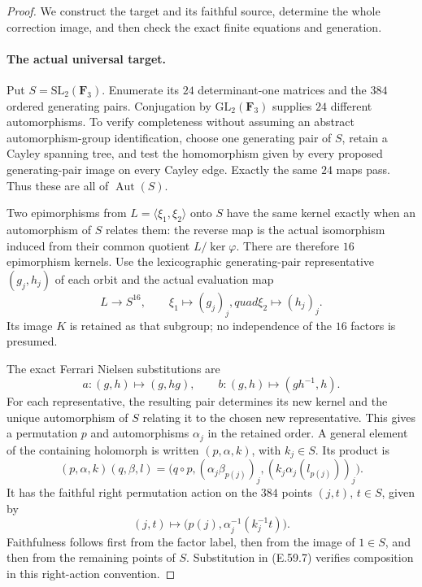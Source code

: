 \begin{proof}
We construct the target and its faithful source, determine the whole
correction image, and then check the exact finite equations and generation.

\paragraph{The actual universal target.}
Put $S=\mathrm{SL}_2(\mathbf F_3)$. Enumerate its $24$ determinant-one
matrices and the $384$ ordered generating pairs. Conjugation by
$\mathrm{GL}_2(\mathbf F_3)$ supplies $24$ different automorphisms.
To verify completeness without assuming an abstract automorphism-group
identification, choose one generating pair of $S$, retain a Cayley
spanning tree, and test the homomorphism given by every proposed
generating-pair image on every Cayley edge. Exactly the same $24$
maps pass. Thus these are all of $\operatorname{Aut}(S)$.

Two epimorphisms from $L=\langle\xi_1,\xi_2\rangle$ onto $S$ have
the same kernel exactly when an automorphism of $S$ relates them:
the reverse map is the actual isomorphism induced from their common
quotient $L/\ker\varphi$. There are therefore $16$ epimorphism kernels.
Use the lexicographic generating-pair representative $(g_j,h_j)$ of
each orbit and the actual evaluation map
\[
 L\longrightarrow S^{16},\qquad
 \xi_1\longmapsto(g_j)_j,quad
 \xi_2\longmapsto(h_j)_j.
 \tag{E.59.5}
\]
Its image $K$ is retained as that subgroup; no independence of the
$16$ factors is presumed.

The exact Ferrari Nielsen substitutions are
\[
 a:(g,h)\longmapsto(g,hg),\qquad
 b:(g,h)\longmapsto(gh^{-1},h).
 \tag{E.59.6}
\]
For each representative, the resulting pair determines its new
kernel and the unique automorphism of $S$ relating it to the chosen
new representative. This gives a permutation $p$ and automorphisms
$\alpha_j$ in the retained order. A general element of the containing
holomorph is written $(p,\alpha,k)$, with $k_j\in S$. Its product is
\[
 (p,\alpha,k)(q,\beta,l)=
 \bigl(q\circ p,(\alpha_j\beta_{p(j)})_j,
                   (k_j\alpha_j(l_{p(j)}))_j\bigr).
 \tag{E.59.7}
\]
It has the faithful right permutation action on the $384$ points
$(j,t)$, $t\in S$, given by
\[
 (j,t)\longmapsto
       \bigl(p(j),\alpha_j^{-1}(k_j^{-1}t)\bigr).
 \tag{E.59.8}
\]
Faithfulness follows first from the factor label, then from the image
of $1\in S$, and then from the remaining points of $S$. Substitution
in \textup{(E.59.7)} verifies composition in this right-action convention.


\end{proof}
